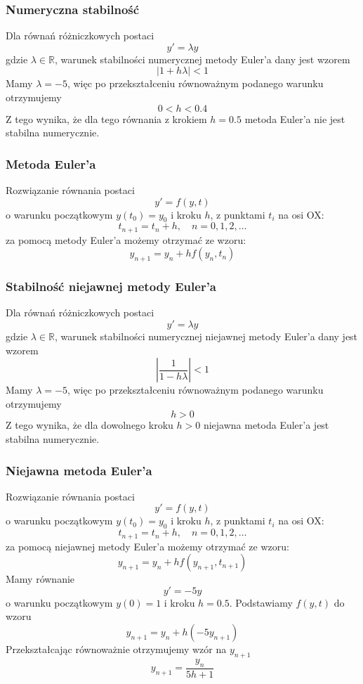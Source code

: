 \documentclass[11pt, leqno]{scrartcl}
\begin{document}
    \subsubsection{Numeryczna stabilność}
    Dla równań różniczkowych postaci
    \[
        y'=\lambda y
    \]
    gdzie $\lambda \in \mathbb{R}$, warunek stabilności
    numerycznej metody Euler'a dany jest wzorem
    \[
        |1+h\lambda|<1
    \]
    Mamy $\lambda =-5$, więc po przekształceniu równoważnym
    podanego warunku otrzymujemy
    \[
        0<h<0.4
    \]
    Z tego wynika, że dla tego równania z krokiem $h=0.5$
    metoda Euler'a nie jest stabilna numerycznie.

    \subsubsection{Metoda Euler'a}
    Rozwiązanie równania postaci
    \[
        y'=f(y,t)
    \]
    o warunku początkowym $y(t_0)=y_0$ i kroku $h$, z punktami
    $t_i$ na osi OX:
    \[
        t_{n+1}=t_n+h,\quad n=0,1,2,\dots
    \]
    za pomocą metody Euler'a możemy otrzymać ze wzoru:
    \[
        y_{n+1}=y_n+hf(y_n,t_n)
    \]
    
    \subsubsection{Stabilność niejawnej metody Euler'a}
    Dla równań różniczkowych postaci
    \[
        y'=\lambda y
    \]
    gdzie $\lambda \in \mathbb{R}$, warunek stabilności
    numerycznej niejawnej metody Euler'a dany jest wzorem
    \[
        \left| \frac{1}{1-h\lambda} \right| <1
    \]
    Mamy $\lambda =-5$, więc po przekształceniu równoważnym
    podanego warunku otrzymujemy
    \[
        h>0
    \]
    Z tego wynika, że dla dowolnego kroku $h>0$ niejawna metoda
    Euler'a jest stabilna numerycznie.

    \subsubsection{Niejawna metoda Euler'a}
    Rozwiązanie równania postaci
    \[
        y'=f(y,t)
    \]
    o warunku początkowym $y(t_0)=y_0$ i kroku $h$, z punktami
    $t_i$ na osi OX:
    \[
        t_{n+1}=t_n+h,\quad n=0,1,2,\dots
    \]
    za pomocą niejawnej metody Euler'a możemy otrzymać ze
    wzoru:
    \[
        y_{n+1}=y_n+hf(y_{n+1},t_{n+1})
    \]
    Mamy równanie
    \[
        y'=-5y
    \]
    o warunku początkowym $y(0)=1$ i kroku $h=0.5$.
    Podstawiamy $f(y,t)$ do wzoru
    \[
        y_{n+1}=y_n+h(-5y_{n+1})
    \]
    Przekształcając równoważnie otrzymujemy wzór na $y_{n+1}$
    \[
        y_{n+1}=\frac{y_n}{5h+1}
    \]
\end{document}
